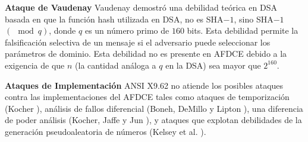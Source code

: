 \documentclass[11pt]{article}
\numberwithin{equation}{section} %
\numberwithin{figure}{section} %
\numberwithin{table}{section} %
\begin{document}
		\textbf{Ataque de Vaudenay} Vaudenay \cite{Vau96} demostró una debilidad teórica en DSA basada en que la función hash utilizada en DSA, no es SHA$-1$, sino SHA$-1$ $(\mod q)$, donde $q$ es un número primo de $160$ bits. Esta debilidad permite la falsificación selectiva de un mensaje si el adversario puede seleccionar los parámetros de dominio. Esta debilidad no es presente en AFDCE debido a la exigencia de que $n$ (la cantidad análoga a $q$ en la DSA) sea mayor que $2^{160}$.


		\textbf{Ataques de Implementación} ANSI X9.62 no atiende los posibles ataques contra las implementaciones del AFDCE tales como ataques de temporización (Kocher \cite{Koc96}), análisis de fallos diferencial (Boneh, DeMillo y Lipton \cite{BDL}), una diferencia de poder análisis (Kocher, Jaffe y Jun \cite{KJJ}), y ataques que explotan debilidades de la generación pseudoaleatoria de números (Kelsey et al. \cite{KSWH}).


\end{document}

